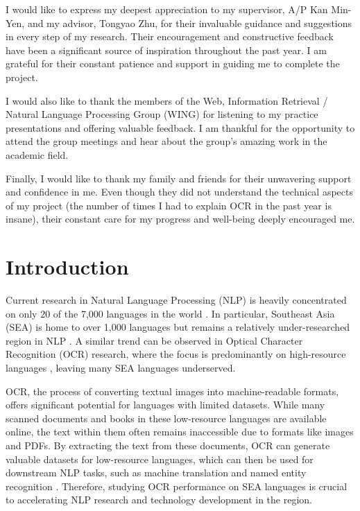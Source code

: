 \documentclass[12pt,oneside]{memoir}
\begin{document}
I would like to express my deepest appreciation to my supervisor, A/P Kan Min-Yen, and my advisor, Tongyao Zhu, for their invaluable guidance and suggestions in every step of my research. 
Their encouragement and constructive feedback have been a significant source of inspiration throughout the past year.
I am grateful for their constant patience and support in guiding me to complete the project.

I would also like to thank the members of the Web, Information Retrieval / Natural Language Processing Group (WING) for listening to my practice presentations and offering valuable feedback. 
I am thankful for the opportunity to attend the group meetings and hear about the group's amazing work in the academic field.

Finally, I would like to thank my family and friends for their unwavering support and confidence in me.
Even though they did not understand the technical aspects of my project (the number of times I had to explain OCR in the past year is insane), their constant care for my progress and well-being deeply encouraged me.

\listoffigures
\listoftables
\tableofcontents

\mainmatter

\chapter{Introduction}
Current research in Natural Language Processing (NLP) is heavily concentrated on only 20 of the 7,000 languages in the world \parencite{magueresse-etal-2020}.
In particular, Southeast Asia (SEA) is home to over 1,000 languages but remains a relatively under-researched region in NLP \parencite{aji-etal-2023}.
A similar trend can be observed in Optical Character Recognition (OCR) research, where the focus is predominantly on high-resource languages \parencite{salehudin-etal-2023, smith-2007}, leaving many SEA languages underserved.

OCR, the process of converting textual images into machine-readable formats, offers significant potential for languages with limited datasets. While many scanned documents and books in these low-resource languages are available online, the text within them often remains inaccessible due to formats like images and PDFs. By extracting the text from these documents, OCR can generate valuable datasets for low-resource languages, which can then be used for downstream NLP tasks, such as machine translation and named entity recognition \parencite{agarwal-and-anastasopoulos-2024, ignat-etal-2022}.
Therefore, studying OCR performance on SEA languages is crucial to accelerating NLP research and technology development in the region.
\end{document}
